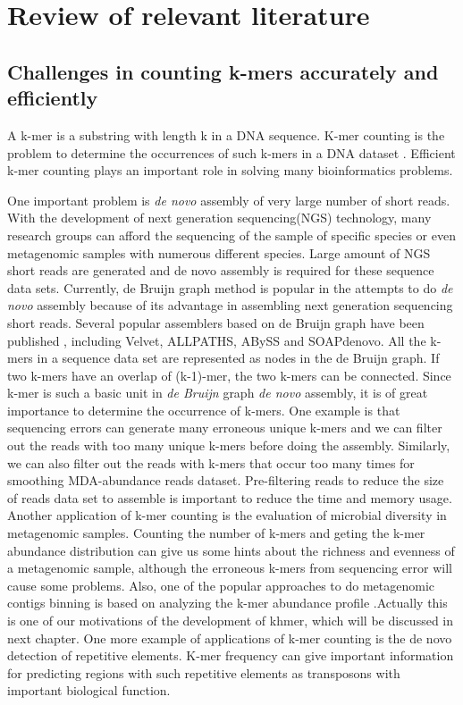 \chapter{Review of relevant literature}


\section{Challenges in counting k-mers accurately and efficiently}

A k-mer is a substring with length k in a DNA sequence. K-mer counting is the
problem to determine the occurrences of such k-mers in a DNA dataset 
\cite{Marcais2011}. Efficient k-mer counting plays an important role in solving many
bioinformatics problems. 

One important problem is \textit{de novo} assembly of very large number of short reads.
With the development of next generation sequencing(NGS) technology, many research
groups can afford the sequencing of the sample of specific species or even
metagenomic samples with numerous different species\cite{pubmed19997069}. 
Large amount of NGS short reads are generated and de novo assembly is
required for these sequence data sets\cite{pubmed20211242}. Currently, de Bruijn graph method is
popular in the attempts to do \textit{de novo} assembly because of its advantage in
assembling next generation sequencing short reads\cite{Pevzner2001}. Several
popular assemblers based on de Bruijn graph have been published , including 
Velvet\cite{Zerbino2008}, ALLPATHS\cite{Butler2008}, ABySS\cite{Simpson2009}
and SOAPdenovo\cite{Li2010}. All the k-mers in a sequence
data set are represented as nodes in the de Bruijn graph. If
two k-mers have an overlap of (k-1)-mer, the two k-mers can be connected. Since
k-mer is such a basic unit in \textit{de Bruijn} graph \textit{de novo}
assembly, it is of
great importance to determine the occurrence of k-mers. One example is that
sequencing errors can generate many erroneous unique k-mers and we can filter
out the reads with too many unique k-mers before doing the assembly. Similarly,
we can also filter out the reads with k-mers that occur too many times for
smoothing MDA-abundance reads dataset. Pre-filtering reads to reduce the size
of reads data set to assemble is important to reduce the time and memory usage.
Another application of k-mer counting is the evaluation of microbial diversity
in metagenomic samples. Counting the number of k-mers and geting the k-mer
abundance distribution can give us some hints about the richness and evenness
of a metagenomic sample, although the erroneous k-mers from sequencing error
will cause some problems. Also, one of the popular approaches to do metagenomic
contigs binning is based on analyzing the k-mer abundance profile 
\cite{Patil:2012aa} \cite{Brady:2011aa}\cite{Rosen:2011aa}.Actually this is 
one of our motivations of the development of khmer, which
will be discussed in next chapter. One more example of applications of 
k-mer counting is the de novo detection of repetitive
elements. K-mer frequency can give important information for predicting regions
with  such repetitive elements as transposons with important biological
function.\cite{Kurtz2008}

